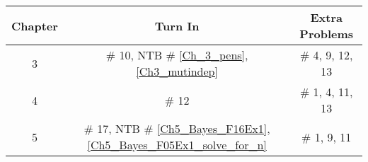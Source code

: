 \documentclass[12pt]{article}
\begin{document}
\begin{center}
\begin{tabular}{|c|c||c|}
\hline
Chapter & Turn In & Extra Problems\\
\hline



3 & \# 10, NTB  \# \ref{Ch_3_pens}, \ref{Ch3_mutindep}   & \#  4, 9, 12, 13 %
\\
\hline
4  & \# 12 & \# 1, 4, 11, 13\\
\hline	

5 & \# 17, NTB \# \ref{Ch5_Bayes_F16Ex1}, \ref{Ch5_Bayes_F05Ex1_solve_for_n}  & \# 1, 9, 11\\%
\hline





\end{tabular}
\end{center}
\end{document}
